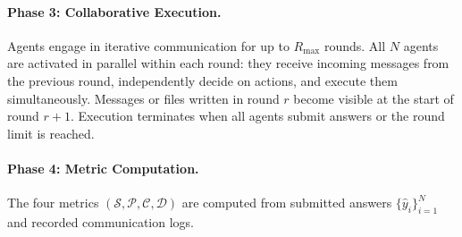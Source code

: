 \paragraph{Phase 3: Collaborative Execution.}
Agents engage in iterative communication for up to $R_{\max}$ rounds. 
All $N$ agents are activated in parallel within each round: they receive incoming messages from the previous round, independently decide on actions, and execute them simultaneously. 
Messages or files written in round $r$ become visible at the start of round $r+1$. 
Execution terminates when all agents submit answers or the round limit is reached.

\paragraph{Phase 4: Metric Computation.}
The four metrics $(\mathcal{S}, \mathcal{P}, \mathcal{C}, \mathcal{D})$ are computed from submitted answers $\{\hat{y}_i\}_{i=1}^{N}$ and recorded communication logs.